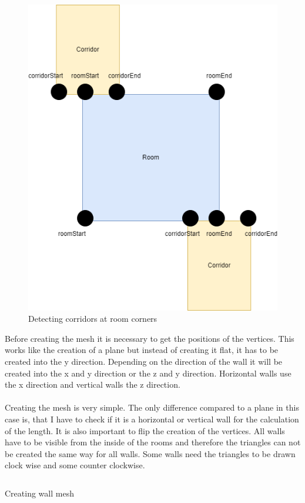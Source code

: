 \documentclass[a4paper,11pt,oneside]{scrreprt}
\begin{document}
\begin{figure}[htb]
	\centering
	\includegraphics[scale=0.49]{images/detecting_corridors2.drawio.png}    
	\caption{Detecting corridors at room corners}
	\label{fig:detecting-corridors-at-room-corners}
\end{figure}

Before creating the mesh it is necessary to get the positions of the vertices. This works like the creation of a plane but instead of creating it flat, it has to be created into the y direction. Depending on the direction of the wall it will be created into the x and y direction or the z and y direction. Horizontal walls use the x direction and vertical walls the z direction. 
\\
\\
Creating the mesh is very simple. The only difference compared to a plane in this case is, that I have to check if it is a horizontal or vertical wall for the calculation of the length. It is also important to flip the creation of the vertices. 
All walls have to be visible from the inside of the rooms and therefore the triangles can not be created the same way for all walls. Some walls need the triangles to be drawn clock wise and some counter clockwise.
\\
\begin{listing}[ht]
    \inputminted[fontsize=\footnotesize,linenos]{csharp}{code/CreateWalls3.cs}
    \caption[Creating wall mesh]{Creating wall mesh}
    \label{code:creating-wall-mesh}
\end{listing}
\end{document}
